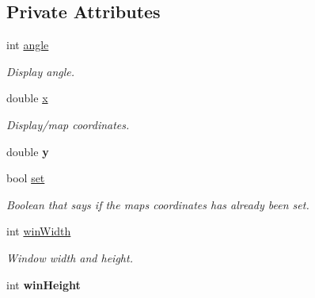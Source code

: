\subsection*{Private Attributes}
\begin{DoxyCompactItemize}
\item 
int \hyperlink{classTileset_a14a536a131ec50f70506ebeb6b023eb3}{angle}\hypertarget{classTileset_a14a536a131ec50f70506ebeb6b023eb3}{}\label{classTileset_a14a536a131ec50f70506ebeb6b023eb3}

\begin{DoxyCompactList}\small\item\em Display angle. \end{DoxyCompactList}\item 
double \hyperlink{classTileset_ac3790af3bd81b898b6c8187dc8864b87}{x}\hypertarget{classTileset_ac3790af3bd81b898b6c8187dc8864b87}{}\label{classTileset_ac3790af3bd81b898b6c8187dc8864b87}

\begin{DoxyCompactList}\small\item\em Display/map coordinates. \end{DoxyCompactList}\item 
double {\bfseries y}\hypertarget{classTileset_a45bf461d2f34cf65cf4c9538250df1e2}{}\label{classTileset_a45bf461d2f34cf65cf4c9538250df1e2}

\item 
bool \hyperlink{classTileset_a2eaff329102c53490295885e81d2ab39}{set}\hypertarget{classTileset_a2eaff329102c53490295885e81d2ab39}{}\label{classTileset_a2eaff329102c53490295885e81d2ab39}

\begin{DoxyCompactList}\small\item\em Boolean that says if the maps coordinates has already been set. \end{DoxyCompactList}\item 
int \hyperlink{classTileset_a47cb91f14b9266523ced0cda8fe20ada}{win\+Width}\hypertarget{classTileset_a47cb91f14b9266523ced0cda8fe20ada}{}\label{classTileset_a47cb91f14b9266523ced0cda8fe20ada}

\begin{DoxyCompactList}\small\item\em Window width and height. \end{DoxyCompactList}\item 
int {\bfseries win\+Height}\hypertarget{classTileset_a09af95ee2033f299bcf7ded7bd7f4fad}{}\label{classTileset_a09af95ee2033f299bcf7ded7bd7f4fad}


\end{DoxyCompactItemize}
